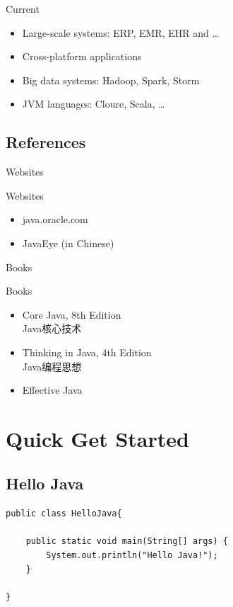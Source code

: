 \documentclass[UTF8]{beamer}
\begin{document}
\begin{frame}[t]{Current}
  \begin{itemize}
    \item Large-scale systems: ERP, EMR, EHR and \ldots
    \item Cross-platform applications
    \item Big data systems: Hadoop, Spark, Storm
    \item JVM languages: Cloure, Scala, \ldots
  \end{itemize}
\end{frame}


\subsection{References}

\begin{frame}[t]{Websites}
  \begin{block}{Websites}
    \begin{itemize}
      \item java.oracle.com
      \item JavaEye (in Chinese)
    \end{itemize}
  \end{block}
\end{frame}

\begin{frame}[t]{Books}
  \begin{block}{Books}
    \begin{itemize}
      \item Core Java, 8th Edition\\
      Java核心技术
      \item Thinking in Java, 4th Edition\\
      Java编程思想
      \item Effective Java
    \end{itemize}
  \end{block}
\end{frame}

\section{Quick Get Started}
\subsection{Hello Java}
\begin{frame}[fragile]
\begin{verbatim}
public class HelloJava{

    public static void main(String[] args) {
        System.out.println("Hello Java!");
    }

}
\end{verbatim}
\end{frame}
\end{document}
